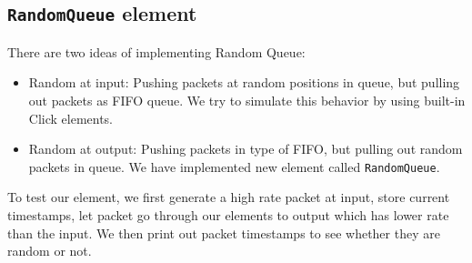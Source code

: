 \documentclass[a4paper]{article}
\begin{document}
  \subsection{\texttt{RandomQueue} element}
  There are two ideas of implementing Random Queue:
  \begin{itemize}
  	\item Random at input: Pushing packets at random positions in queue, but pulling out packets as FIFO queue. We try to simulate this behavior by using built-in Click elements.
  	\item Random at output: Pushing packets in type of FIFO, but pulling out random packets in queue. We have implemented new element called \texttt{RandomQueue}.
  \end{itemize}
  To test our element, we first generate a high rate packet at input, store current timestamps, let packet go through our elements to output which has lower rate than the input. We then print out packet timestamps to see whether they are random or not.
\end{document}
